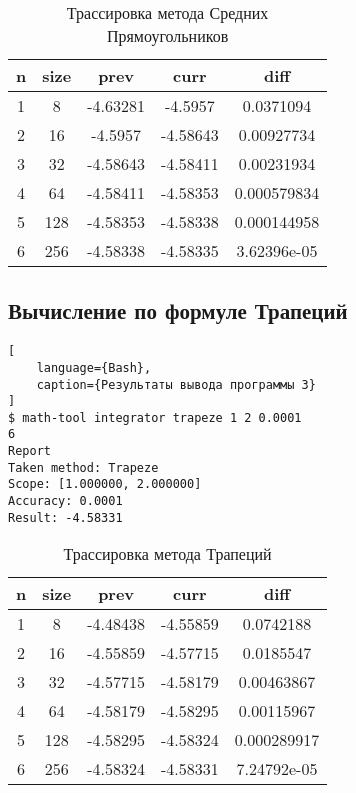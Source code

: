 \documentclass{article}
\begin{document}
\begin{table}[h]
    \centering
    \caption{Трассировка метода Средних Прямоугольников}
    \begin{tabular}{|c|c|c|c|c|}
        \hline
        n & size & prev     & curr     & diff        \\ \hline
        1 & 8    & -4.63281 & -4.5957  & 0.0371094   \\ \hline
        2 & 16   & -4.5957  & -4.58643 & 0.00927734  \\ \hline
        3 & 32   & -4.58643 & -4.58411 & 0.00231934  \\ \hline
        4 & 64   & -4.58411 & -4.58353 & 0.000579834 \\ \hline
        5 & 128  & -4.58353 & -4.58338 & 0.000144958 \\ \hline
        6 & 256  & -4.58338 & -4.58335 & 3.62396e-05 \\ \hline
    \end{tabular}
\end{table}


\subsection{Вычисление по формуле Трапеций}

\begin{lstlisting}[
    language={Bash},
    caption={Результаты вывода программы 3}
]
$ math-tool integrator trapeze 1 2 0.0001
6
Report
Taken method: Trapeze
Scope: [1.000000, 2.000000]
Accuracy: 0.0001
Result: -4.58331
\end{lstlisting}

\begin{table}[h]
    \centering
    \caption{Трассировка метода Трапеций}
    \begin{tabular}{|c|c|c|c|c|}
        \hline
        n & size & prev     & curr     & diff        \\ \hline
        1 & 8    & -4.48438 & -4.55859 & 0.0742188   \\ \hline
        2 & 16   & -4.55859 & -4.57715 & 0.0185547   \\ \hline
        3 & 32   & -4.57715 & -4.58179 & 0.00463867  \\ \hline
        4 & 64   & -4.58179 & -4.58295 & 0.00115967  \\ \hline
        5 & 128  & -4.58295 & -4.58324 & 0.000289917 \\ \hline
        6 & 256  & -4.58324 & -4.58331 & 7.24792e-05 \\ \hline
    \end{tabular}
\end{table}
\end{document}
